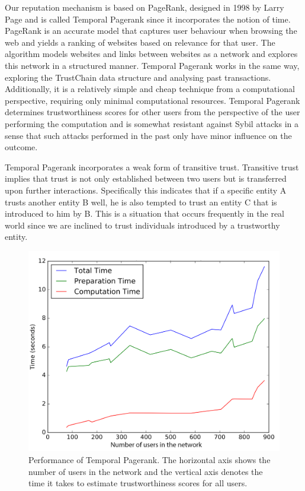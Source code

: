 \documentclass[USenglish]{article}
\begin{document}
Our reputation mechanism is based on PageRank, designed in 1998 by Larry Page and is called Temporal Pagerank since it incorporates the notion of time.
PageRank is an accurate model that captures user behaviour when browsing the web and yields a ranking of websites based on relevance for that user.
The algorithm models websites and links between websites as a network and explores this network in a structured manner.
Temporal Pagerank works in the same way, exploring the TrustChain data structure and analysing past transactions.
Additionally, it is a relatively simple and cheap technique from a computational perspective, requiring only minimal computational resources.
Temporal Pagerank determines trustworthiness scores for other users from the perspective of the user performing the computation and is somewhat resistant against Sybil attacks in a sense that such attacks performed in the past only have minor influence on the outcome.

Temporal Pagerank incorporates a weak form of transitive trust.
Transitive trust implies that trust is not only established between two users but is transferred upon further interactions.
Specifically this indicates that if a specific entity A trusts another entity B well, he is also tempted to trust an entity C that is introduced to him by B.
This is a situation that occurs frequently in the real world since we are inclined to trust individuals introduced by a trustworthy entity.

\begin{figure}[t]
	\centering
	\includegraphics[width=0.6\columnwidth]{assets/pagerank_times}
	\caption{Performance of Temporal Pagerank. The horizontal axis shows the number of users in the network and the vertical axis denotes the time it takes to estimate trustworthiness scores for all users.}
	\label{fig:pagerank_performance}
\end{figure}
\end{document}
